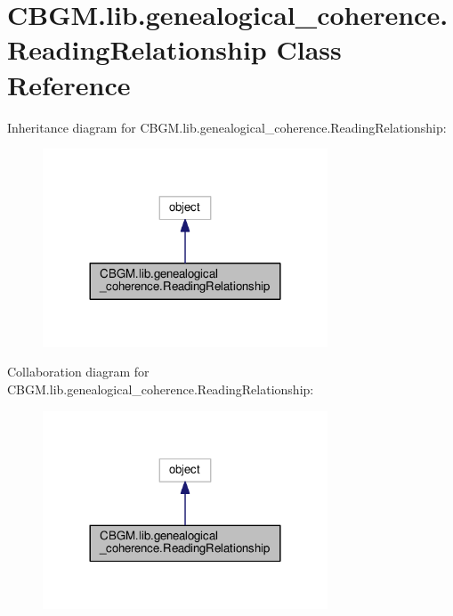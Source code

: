 \hypertarget{classCBGM_1_1lib_1_1genealogical__coherence_1_1ReadingRelationship}{}\section{C\+B\+G\+M.\+lib.\+genealogical\+\_\+coherence.\+Reading\+Relationship Class Reference}
\label{classCBGM_1_1lib_1_1genealogical__coherence_1_1ReadingRelationship}


Inheritance diagram for C\+B\+G\+M.\+lib.\+genealogical\+\_\+coherence.\+Reading\+Relationship\+:\nopagebreak
\begin{figure}[H]
\begin{center}
\leavevmode
\includegraphics[width=240pt]{classCBGM_1_1lib_1_1genealogical__coherence_1_1ReadingRelationship__inherit__graph}
\end{center}
\end{figure}


Collaboration diagram for C\+B\+G\+M.\+lib.\+genealogical\+\_\+coherence.\+Reading\+Relationship\+:\nopagebreak
\begin{figure}[H]
\begin{center}
\leavevmode
\includegraphics[width=240pt]{classCBGM_1_1lib_1_1genealogical__coherence_1_1ReadingRelationship__coll__graph}
\end{center}
\end{figure}
